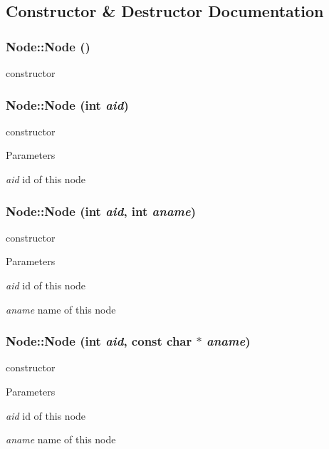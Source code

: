 \subsection{Constructor \& Destructor Documentation}
\hypertarget{classNode_ad7a34779cad45d997bfd6d3d8043c75f}{
\subsubsection[{Node}]{\setlength{\rightskip}{0pt plus 5cm}Node::Node ()}}
\label{classNode_ad7a34779cad45d997bfd6d3d8043c75f}
constructor \hypertarget{classNode_af6165e50e0ce42c0cfad89e62066be69}{
\subsubsection[{Node}]{\setlength{\rightskip}{0pt plus 5cm}Node::Node (int {\em aid})}}
\label{classNode_af6165e50e0ce42c0cfad89e62066be69}
constructor 
\begin{DoxyParams}{Parameters}
\item[{\em aid}]id of this node \end{DoxyParams}
\hypertarget{classNode_a5161742d57505f425fb3f8b8ab0c883e}{
\subsubsection[{Node}]{\setlength{\rightskip}{0pt plus 5cm}Node::Node (int {\em aid}, \/  int {\em aname})}}
\label{classNode_a5161742d57505f425fb3f8b8ab0c883e}
constructor 
\begin{DoxyParams}{Parameters}
\item[{\em aid}]id of this node \item[{\em aname}]name of this node \end{DoxyParams}
\hypertarget{classNode_aa8da7627c64a07c011e78cd71d9d5f8e}{
\subsubsection[{Node}]{\setlength{\rightskip}{0pt plus 5cm}Node::Node (int {\em aid}, \/  const char $\ast$ {\em aname})}}
\label{classNode_aa8da7627c64a07c011e78cd71d9d5f8e}
constructor 
\begin{DoxyParams}{Parameters}
\item[{\em aid}]id of this node \item[{\em aname}]name of this node \end{DoxyParams}
